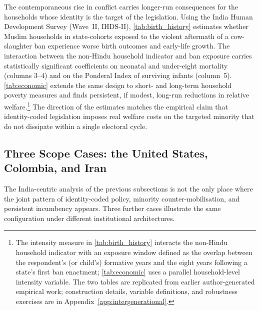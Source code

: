 The contemporaneous
rise in conflict carries longer-run consequences for the households whose
identity is the target of the legislation. Using the India Human
Development Survey (Wave~II, IHDS-II), \autoref{tab:birth_history}
estimates whether Muslim households in state-cohorts exposed to the violent
aftermath of a cow-slaughter ban experience worse birth outcomes and
early-life growth. The interaction between the non-Hindu household
indicator and ban exposure carries statistically significant coefficients
on neonatal and under-eight mortality (columns 3--4) and on the Ponderal
Index of surviving infants (column~5). \autoref{tab:economic} extends the
same design to short- and long-term household poverty measures and finds
persistent, if modest, long-run reductions in relative
welfare.\footnote{The intensity measure in
\autoref{tab:birth_history} interacts the non-Hindu household indicator
with an exposure window defined as the overlap between the respondent's
(or child's) formative years and the eight years following a state's first
ban enactment; \autoref{tab:economic} uses a parallel household-level
intensity variable. The two tables are replicated from earlier
author-generated empirical work; construction details, variable definitions,
and robustness exercises are in Appendix~\ref{app:intergenerational}.} The
direction of the estimates matches the empirical claim that identity-coded
legislation imposes real welfare costs on the targeted minority that do not
dissipate within a single electoral cycle.

\subsection{Three Scope Cases: the United States, Colombia, and Iran}
\label{subsec:other_democracies}

The India-centric analysis of the previous subsections is not the only
place where the joint pattern of identity-coded policy, minority
counter-mobilisation, and persistent incumbency appears. Three further
cases illustrate the same configuration under different institutional
architectures.


